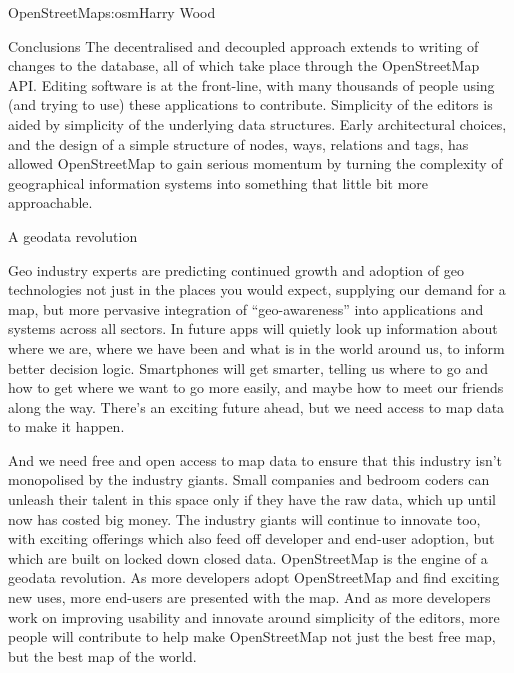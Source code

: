 \begin{aosachapter}{OpenStreetMap}{s:osm}{Harry Wood}
\begin{aosasect1}{Conclusions}
The decentralised and decoupled approach extends to writing of changes
to the database, all of which take place through the OpenStreetMap
API. Editing software is at the front-line, with many thousands of
people using (and trying to use) these applications to
contribute. Simplicity of the editors is aided by simplicity of the
underlying data structures. Early architectural choices, and the
design of a simple structure of nodes, ways, relations and tags, has
allowed OpenStreetMap to gain serious momentum by turning the
complexity of geographical information systems into something that
little bit more approachable.

\begin{aosasect2}{A geodata revolution}

Geo industry experts are predicting continued growth and adoption of
geo technologies not just in the places you would expect, supplying
our demand for a map, but more pervasive integration of
``geo-awareness'' into applications and systems across all sectors. In
future apps will quietly look up information about where we are, where
we have been and what is in the world around us, to inform better
decision logic. Smartphones will get smarter, telling us where to go
and how to get where we want to go more easily, and maybe how to meet
our friends along the way. There's an exciting future ahead, but we
need access to map data to make it happen.

And we need free and open access to map data to ensure that this
industry isn't monopolised by the industry giants. Small companies and
bedroom coders can unleash their talent in this space only if they
have the raw data, which up until now has costed big money. The
industry giants will continue to innovate too, with exciting offerings
which also feed off developer and end-user adoption, but which are
built on locked down closed data. OpenStreetMap is the engine of a
geodata revolution. As more developers adopt OpenStreetMap and find
exciting new uses, more end-users are presented with the map. And as
more developers work on improving usability and innovate around
simplicity of the editors, more people will contribute to help make
OpenStreetMap not just the best free map, but the best map of the
world.

\end{aosasect2}

\end{aosasect1}

\end{aosachapter}
